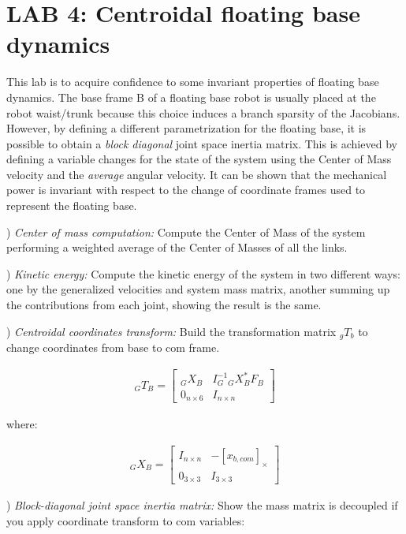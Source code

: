 \documentclass{report}
\newcommand{\mat}[1]{\ensuremath{\begin{bmatrix}#1\end{bmatrix}}}	%
\begin{document}
\section*{LAB 4: Centroidal floating base  dynamics}

This lab is to acquire confidence to some invariant properties of floating base dynamics. 
The base frame B of a floating base robot is usually placed at the robot waist/trunk because this choice induces a  branch sparsity of the Jacobians. 
However, by defining a different parametrization for the floating base, it is possible to obtain a \textit{block diagonal} joint space inertia matrix.  This is achieved by defining a variable changes for the state of the system using the Center of Mass velocity and the \textit{average} angular velocity.  It can be shown that the mechanical power is invariant with respect to the change of coordinate frames used to represent the floating base. 

\quad

) \textit{Center of mass computation:}
Compute the Center of Mass of the system performing a weighted average of the Center of Masses of all the links. 

\quad

) \textit{Kinetic energy:}
Compute the kinetic energy of the system in two different ways: one by the generalized velocities and system mass matrix, another summing up the contributions from each joint, showing the result is the same. 

\quad

) \textit{Centroidal coordinates transform:} 
Build the transformation matrix ${}_gT_b$ to change coordinates from base to com frame.


\begin{align}
{}_GT_B  = \mat{    {}_GX_B  & I_G^{-1} {}_GX_B^{*} F_B  \\ 0_{n \times 6} &   I_{n \times n} }
\end{align}

where: 

\begin{align}
 {}_GX_B = \mat{ I_{n \times n}  & -[x_{b, com}]_{\times} \\ 0_{3 \times 3} & 	 I_{3 \times 3}}
 	\label{fig:}
\end{align}

\quad

) \textit{Block-diagonal joint space inertia matrix:}
Show the mass matrix is decoupled if you apply coordinate transform to com variables:
\end{document}

